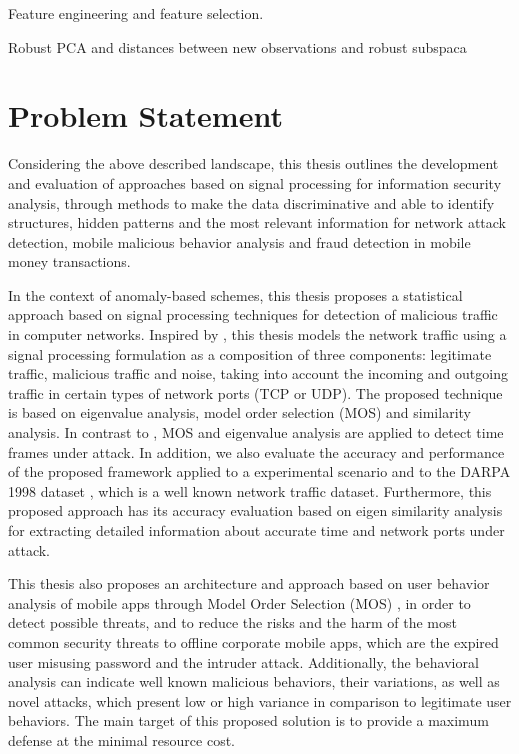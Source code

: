 Feature engineering and feature selection.

Robust PCA and distances between new observations and robust subspaca

\section{Problem Statement}
\label{sc:problems}

Considering the above described landscape, this thesis outlines the development and evaluation of approaches based on signal processing for information security analysis, through methods to make the data discriminative and able to identify structures, hidden patterns and the most relevant information for network attack detection, mobile malicious behavior analysis and fraud detection in mobile money transactions.

In the context of anomaly-based schemes, this thesis proposes a statistical approach based on signal processing techniques for detection of malicious traffic in computer networks. Inspired by \cite{david2011blind,da2012improved}, this thesis models the network traffic using a signal processing formulation as a composition of three components: legitimate traffic, malicious traffic and noise, taking into account the incoming and outgoing traffic in certain types of network ports (TCP or UDP). The proposed technique is based on eigenvalue analysis, model order selection (MOS) and similarity analysis. In contrast to \cite{david2011blind,da2012improved,tenorio2013greatest}, MOS and eigenvalue analysis are applied to detect time frames under attack. In addition, we also evaluate the accuracy and performance of the proposed framework applied to a experimental scenario and to the DARPA 1998 dataset \citep{osanaiye2016distributed}, which is a well known network traffic dataset. Furthermore, this proposed approach has its accuracy evaluation based on eigen similarity analysis for extracting detailed information about accurate time and network ports under attack.

This thesis also proposes an architecture and approach based on user behavior analysis of mobile apps through Model Order Selection (MOS) \cite{tenorio2013greatest}, in order to detect possible threats, and to reduce the risks and the harm of the most common security threats to offline corporate mobile apps, which are the expired user misusing password and the intruder attack. Additionally, the behavioral analysis can indicate well known malicious behaviors, their variations, as well as novel attacks, which present low or high variance in comparison to legitimate user behaviors. The main target of this proposed solution is to provide a maximum defense at the minimal resource cost.


